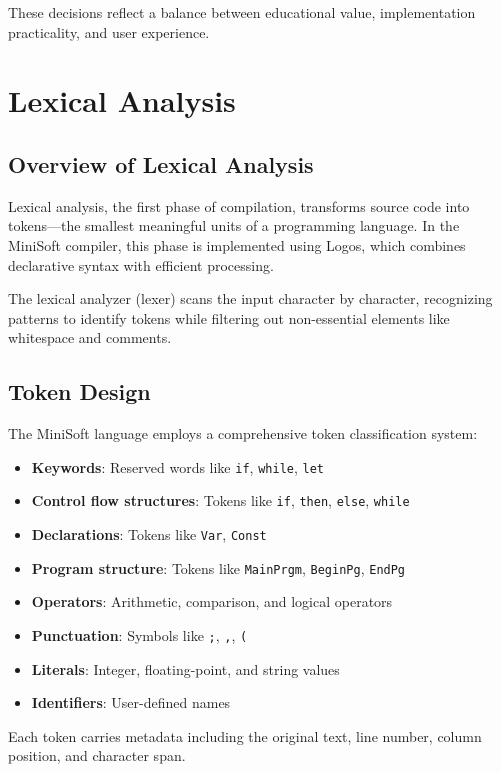 \documentclass[12pt,a4paper]{article}
\begin{document}
These decisions reflect a balance between educational value, implementation practicality, and user experience.

\section{Lexical Analysis}
\subsection{Overview of Lexical Analysis}
Lexical analysis, the first phase of compilation, transforms source code into tokens—the smallest meaningful units of a programming language. In the MiniSoft compiler, this phase is implemented using Logos, which combines declarative syntax with efficient processing.

The lexical analyzer (lexer) scans the input character by character, recognizing patterns to identify tokens while filtering out non-essential elements like whitespace and comments.

\subsection{Token Design}
The MiniSoft language employs a comprehensive token classification system:

\begin{itemize}
	\item \textbf{Keywords}: Reserved words like \texttt{if}, \texttt{while}, \texttt{let}
	\item \textbf{Control flow structures}: Tokens like \texttt{if}, \texttt{then}, \texttt{else}, \texttt{while}
	\item \textbf{Declarations}: Tokens like \texttt{Var}, \texttt{Const}
	\item \textbf{Program structure}: Tokens like \texttt{MainPrgm}, \texttt{BeginPg}, \texttt{EndPg}
	\item \textbf{Operators}: Arithmetic, comparison, and logical operators
	\item \textbf{Punctuation}: Symbols like \texttt{;}, \texttt{,}, \texttt{(}
	\item \textbf{Literals}: Integer, floating-point, and string values
	\item \textbf{Identifiers}: User-defined names
\end{itemize}

Each token carries metadata including the original text, line number, column position, and character span.
\end{document}
